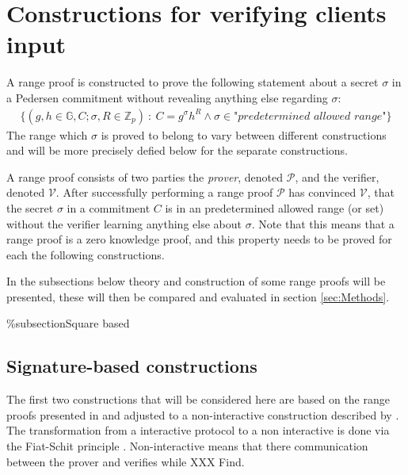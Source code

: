 

\section{Constructions for verifying clients input}
\label{sec:RF_theory}
A range proof is constructed to prove the following statement about a secret $\sigma$ in a Pedersen commitment without revealing anything else regarding $\sigma$:
\begin{align*}
    \{(g,h\in\mathds{G},C;\sigma,R\in\mathds{Z}_p)\::\:C= g^\sigma h^R \wedge \sigma\in \textit{"predetermined allowed range"}\}
\end{align*}
The range which $\sigma$ is proved to belong to vary between different constructions and will be more precisely defied below for the separate constructions. 

A range proof consists of two parties the \textit{prover}, denoted $\mathcal{P}$, and the verifier, denoted $\mathcal{V}$. After successfully performing a range proof  $\mathcal{P}$ has convinced $\mathcal{V}$, that the secret $\sigma$ in a commitment $C$ is in an predetermined allowed range (or set) without the verifier learning anything else about $\sigma$. Note that this means that a range proof is a zero knowledge proof, and this property needs to be proved for each the following constructions.


In the subsections below theory and construction of some range proofs will be presented, these will then be compared and evaluated in section \ref{sec:Methods}.

\%subsection{Square based}



\subsection{Signature-based  constructions}
The first two constructions that will be considered here are based on the range proofs presented in \cite{RANGE-SET} and adjusted to a non-interactive construction described by \cite{ZKRP_Morais}. The transformation from a interactive protocol to a non interactive is done via the Fiat-Schit principle \cite{fiat-schmit}.  Non-interactive means that there communication between the prover and verifies while XXX Find. 

